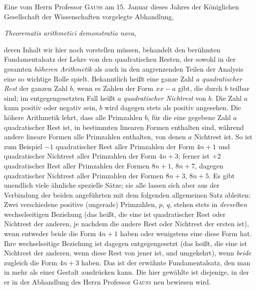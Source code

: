 Eine vom Herrn Professor \textsc{Gauss} am 15. Januar dieses Jahres der Königlichen Gesellschaft der Wissenschaften vorgelegte Abhandlung,
\begin{center}\emph{Theorematis arithmetici demonstratio nova},\end{center}
deren Inhalt wir hier noch vorstellen müssen, behandelt den berühmten Fundamentalsatz der Lehre von den quadratischen Resten, der sowohl in der gesamten \emph{höheren Arithmetik} als auch in den angrenzenden Teilen der Analysis eine so wichtige Rolle spielt. Bekanntlich heißt eine ganze Zahl $a$ \emph{quadratischer Rest} der ganzen Zahl $b$, wenn es Zahlen der Form $xx-a$ gibt, die durch $b$ teilbar sind; im entgegengesetzten Fall heißt $a$ \emph{quadratischer Nichtrest} von $b$. Die Zahl $a$ kann positiv oder negativ sein, $b$ wird dagegen stets als positiv angesehen. Die höhere Arithmetik lehrt, dass alle Primzahlen $b$, für die eine gegebene Zahl $a$ quadratischer Rest ist, in bestimmten linearen Formen enthalten sind, während andere lineare Formen alle Primzahlen enthalten, von denen $a$ Nichtrest ist. So ist zum Beispiel $-1$ quadratischer Rest aller Primzahlen der Form $4n+1$ und quadratischer Nichtrest aller Primzahlen der Form $4n+3$; ferner ist $+2$ quadratischer Rest aller Primzahlen der Formen $8n+1$, $8n+7$, dagegen quadratischer Nichtrest aller Primzahlen der Formen $8n+3$, $8n+5$. Es gibt unendlich viele ähnliche spezielle Sätze; sie alle lassen sich aber aus der Verbindung der beiden angeführten
%
mit dem folgenden allgemeinen Satz ableiten: Zwei verschiedene positive (ungerade) Primzahlen, $p$, $q$, stehen stets in \emph{derselben} wechselseitigen Beziehung (das heißt, die eine ist quadratischer Rest oder Nichtrest der anderen, je nachdem die andere Rest oder Nichtrest der ersten ist), wenn entweder beide die Form $4n+1$ haben oder wenigstens eine diese Form hat. Ihre wechselseitige Beziehung ist dagegen entgegengesetzt (das heißt, die eine ist Nichtrest der anderen, wenn diese Rest von jener ist, und umgekehrt), wenn \emph{beide} zugleich die Form $4n+3$ haben. Das ist der erwähnte Fundamentalsatz, den man in mehr als einer Gestalt ausdrücken kann. Die hier gewählte ist diejenige, in der er in der Abhandlung des Herrn Professor \textsc{Gauss} neu bewiesen wird.

